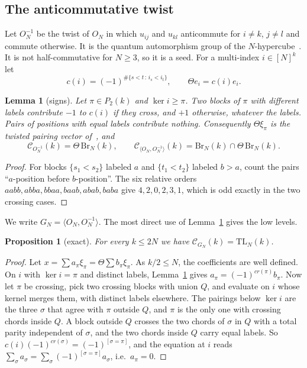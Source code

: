 \documentclass[11pt]{amsart}
\newtheorem{proposition}[theorem]{Proposition}
\newtheorem{lemma}[theorem]{Lemma}
\theoremstyle{definition}
\theoremstyle{remark}
\theoremstyle{plain}
\numberwithin{equation}{section}
\numberwithin{table}{section}
\newcommand{\TL}{\mathrm{TL}}
\newcommand{\Br}{\mathrm{Br}}
\begin{document}
\subsection{The anticommutative twist}\label{sec:twist}

Let $O_N^{-1}$ be the twist of $O_N$ in which $u_{ij}$ and $u_{kl}$ anticommute for $i\ne k$, $j\ne l$ and commute otherwise.
It is the quantum automorphism group of the $N$-hypercube~\cite{bbc}. It is not half-commutative for $N\ge3$, so it is a
seed. For a multi-index $i\in[N]^k$ let
\[
c(i)=(-1)^{\#\{s<t\,:\,i_s<i_t\}},\qquad \Theta e_i=c(i)e_i .
\]

\begin{lemma}[signs]\label{lem:signs}
Let $\pi\in P_2(k)$ and $\ker i\ge\pi$. Two blocks of $\pi$ with different labels contribute $-1$ to $c(i)$ if they cross,
and $+1$ otherwise, whatever the labels. Pairs of positions with equal labels contribute nothing. Consequently
$\Theta\xi_\pi$ is the twisted pairing vector of~\cite{bbc}, and
\[
\mathcal C_{O_N^{-1}}(k)=\Theta\,\Br_N(k),\qquad \mathcal C_{\langle O_N,O_N^{-1}\rangle}(k)=\Br_N(k)\cap\Theta\,\Br_N(k).
\]
\end{lemma}

\begin{proof}
For blocks $\{s_1<s_2\}$ labeled $a$ and $\{t_1<t_2\}$ labeled $b>a$, count the pairs ``$a$-position before
$b$-position''. The six relative orders $aabb,abba,bbaa,baab,abab,baba$ give $4,2,0,2,3,1$, which is odd exactly in the two
crossing cases.
\end{proof}

We write $G_N=\langle O_N,O_N^{-1}\rangle$. The most direct use of Lemma~\ref{lem:signs} gives the low levels.

\begin{proposition}[exact]\label{prop:twoN}
For every $k\le2N$ we have $\mathcal C_{G_N}(k)=\TL_N(k)$.
\end{proposition}

\begin{proof}
Let $x=\sum a_\pi\xi_\pi=\Theta\sum b_\pi\xi_\pi$. As $k/2\le N$, the coefficients are well defined. On $i$ with
$\ker i=\pi$ and distinct labels, Lemma~\ref{lem:signs} gives $a_\pi=(-1)^{cr(\pi)}b_\pi$. Now let $\pi$ be crossing, pick two
crossing blocks with union $Q$, and evaluate on $i$ whose kernel merges them, with distinct labels elsewhere. The pairings
below $\ker i$ are the three $\sigma$ that agree with $\pi$ outside $Q$, and $\pi$ is the only one with crossing chords
inside $Q$. A block outside $Q$ crosses the two chords of $\sigma$ in $Q$ with a total parity independent of $\sigma$, and the
two chords inside $Q$ carry equal labels. So $c(i)(-1)^{cr(\sigma)}=(-1)^{[\sigma=\pi]}$, and the equation at $i$ reads
$\sum_\sigma a_\sigma=\sum_\sigma(-1)^{[\sigma=\pi]}a_\sigma$, i.e.\ $a_\pi=0$.
\end{proof}
\end{document}
